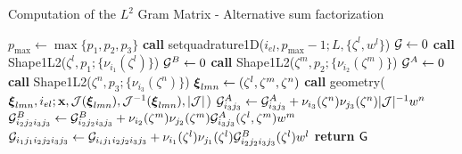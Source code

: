 \begin{algorithm}[ht!]
\caption{Computation of the $L^2$ Gram Matrix - Alternative sum factorization}\label{algo:l2tensor_alt}
\begin{algorithmic}
\State $p_{\max}\gets\max\{p_1,p_2,p_3\}$
\State\textbf{call }setquadrature1D($i_{el},p_{\max}-1;L,\{\zeta^l,w^l\}$)
\State $\mathcal{G}\gets 0$
    \State\textbf{call } Shape1L2($\zeta^l,p_1;\{\nu_{i_1}(\zeta^l)\}$) 
    \State $\mathcal{G}^B\gets 0$
        \State\textbf{call } Shape1L2($\zeta^m,p_2;\{\nu_{i_2}(\zeta^m)\}$) 
        \State $\mathcal{G}^A\gets 0$
            \State\textbf{call } Shape1L2($\zeta^n,p_3;\{\nu_{i_3}(\zeta^n)\}$) 
                    \State $\boldsymbol{\xi}_{lmn}\gets (\zeta^l,\zeta^m,\zeta^n)$
                    \State\textbf{call } geometry( $\boldsymbol{\xi}_{lmn},i_{el};\mathbf{x},\mathcal{J}(\boldsymbol{\xi}_{lmn}),\mathcal{J}^{-1}(\boldsymbol{\xi}_{lmn}),|\mathcal{J}|$)
                    \State$\mathcal{G}_{i_3j_3}^A\gets \mathcal{G}_{i_3j_3}^A+ \nu_{i_3}(\zeta^n)\nu_{j_3}(\zeta^n)|\mathcal{J}|^{-1}w^n$ 
                \EndFor
            \EndFor
        \EndFor
                        \State$\mathcal{G}_{i_2j_2i_3j_3}^B\gets \mathcal{G}_{i_2j_2i_3j_3}^B+ \nu_{i_2}(\zeta^m)\nu_{j_2}(\zeta^m)\mathcal{G}_{i_3j_3}^A(\zeta^l,\zeta^m)w^m$ 
                    \EndFor
                \EndFor
            \EndFor
        \EndFor
    \EndFor
                            \State $\mathcal{G}_{i_1j_1i_2j_2i_3j_3}\gets \mathcal{G}_{i_ij_1i_2j_2i_3j_3}+ \nu_{i_1}(\zeta^l)\nu_{j_1}(\zeta^l)\mathcal{G}_{i_2j_2i_3j_3}^B(\zeta^l)w^l$ 
                        \EndFor
                    \EndFor
                \EndFor
            \EndFor
        \EndFor
    \EndFor
\EndFor
\State \textbf{return} $\mathsf{G}$
\EndProcedure
\end{algorithmic}
\end{algorithm}

